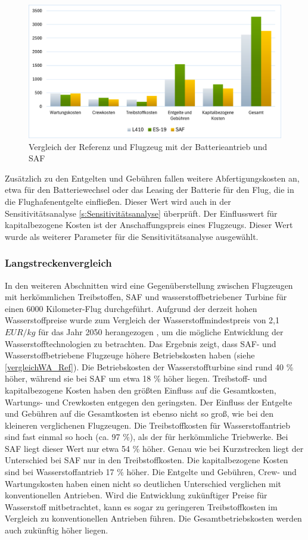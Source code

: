 \begin{figure}[h]
	\centering
	\includegraphics[width=0.9\linewidth]{Bilder/VergleichBA_Ref.png}
	\caption[Betriebskosten]{Vergleich der Referenz und Flugzeug mit der Batterieantrieb und SAF}
	\label{vergleichBA_Ref}
\end{figure}

Zusätzlich zu den Entgelten und Gebühren fallen weitere Abfertigungskosten an,
etwa für den Batteriewechsel oder das Leasing der Batterie für den Flug,
die in die Flughafenentgelte einfließen.
Dieser Wert wird auch in der Sensitivitätsanalyse \ref{s:Sensitivitätsanalyse} überprüft. 
Der Einflusswert für kapitalbezogene Kosten ist der Anschaffungspreis eines Flugzeugs. 
Dieser Wert wurde als weiterer Parameter für die Sensitivitätsanalyse ausgewählt.\\
%
\subsubsection{Langstreckenvergleich}
In den weiteren Abschnitten wird eine Gegenüberstellung zwischen Flugzeugen mit herkömmlichen Treibstoffen, 
SAF und wasserstoffbetriebener Turbine für einen 6000 Kilometer-Flug durchgeführt. %
Aufgrund der derzeit hohen Wasserstoffpreise wurde zum Vergleich der Wasserstoffmindestpreis 
von 2,1 $EUR/kg$ für das Jahr 2050 herangezogen \cite{hoelzen2022hydrogen}, 
um die mögliche Entwicklung der Wasserstofftechnologien zu betrachten.
%
Das Ergebnis zeigt, dass SAF- und Wasserstoffbetriebene Flugzeuge höhere Betriebskosten haben (siehe \ref{vergleichWA_Ref}).
Die Betriebskosten der Wasserstoffturbine sind rund 40 \% höher, während sie bei SAF um etwa 18 \% höher liegen.
Treibstoff- und kapitalbezogene Kosten haben den größten Einfluss auf die Gesamtkosten, 
Wartungs- und Crewkosten entgegen den geringsten.
Der Einfluss der Entgelte und Gebühren auf die Gesamtkosten ist ebenso nicht so groß, 
wie bei den kleineren verglichenen Flugzeugen.
Die Treibstoffkosten für Wasserstoffantrieb sind fast einmal so hoch (ca. 97 \%), als der für herkömmliche Triebwerke. 
Bei SAF liegt dieser Wert nur etwa 54 \% höher. 
Genau wie bei Kurzstrecken liegt der Unterschied bei SAF nur in den Treibstoffkosten.
Die kapitalbezogene Kosten sind bei Wasserstoffantrieb 17 \% höher.
Die Entgelte und Gebühren, Crew- und Wartungskosten haben einen nicht so 
deutlichen Unterschied verglichen mit konventionellen Antrieben. 
%
Wird die Entwicklung zukünftiger Preise für Wasserstoff mitbetrachtet, 
kann es sogar zu geringeren Treibstoffkosten im Vergleich zu konventionellen Antrieben führen. 
Die Gesamtbetriebskosten werden auch zukünftig höher liegen.

